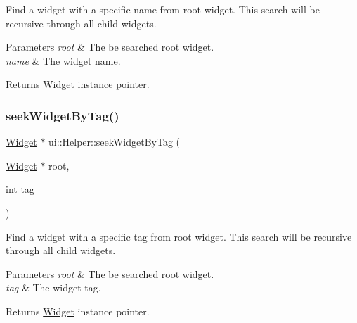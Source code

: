 Find a widget with a specific name from root widget. This search will be recursive through all child widgets.


\begin{DoxyParams}{Parameters}
{\em root} & The be searched root widget. \\
\hline
{\em name} & The widget name. \\
\hline
\end{DoxyParams}
\begin{DoxyReturn}{Returns}
\hyperlink{classui_1_1Widget}{Widget} instance pointer. 
\end{DoxyReturn}
\mbox{\label{classui_1_1Helper_a98364a262ff81d9bf04953845e7cab09}} 
\subsubsection{\texorpdfstring{seek\+Widget\+By\+Tag()}{seekWidgetByTag()}\hspace{0.1cm}{\footnotesize\ttfamily [1/2]}}
{\footnotesize\ttfamily \hyperlink{classui_1_1Widget}{Widget} $\ast$ ui\+::\+Helper\+::seek\+Widget\+By\+Tag (\begin{DoxyParamCaption}\item[{\hyperlink{classui_1_1Widget}{Widget} $\ast$}]{root,  }\item[{int}]{tag }\end{DoxyParamCaption})\hspace{0.3cm}{\ttfamily [static]}}

Find a widget with a specific tag from root widget. This search will be recursive through all child widgets. 
\begin{DoxyParams}{Parameters}
{\em root} & The be searched root widget. \\
\hline
{\em tag} & The widget tag. \\
\hline
\end{DoxyParams}
\begin{DoxyReturn}{Returns}
\hyperlink{classui_1_1Widget}{Widget} instance pointer. 
\end{DoxyReturn}
\mbox{\label{classui_1_1Helper_af3ed8c73f294b3e1887eac95ecab71e4}} 
